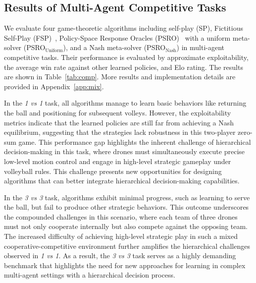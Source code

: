 \subsection{Results of Multi-Agent Competitive Tasks}
We evaluate four game-theoretic algorithms including self-play (SP), Fictitious Self-Play (FSP)~\cite{heinrich2015fictitious}, Policy-Space Response Oracles (PSRO)~\cite{lanctot2017unified} with a uniform meta-solver (PSRO$_\text{Uniform}$), and a Nash meta-solver (PSRO$_\text{Nash}$) in multi-agent competitive tasks. Their performance is evaluated by approximate exploitability, the average win rate against other learned policies, and Elo rating. 
The results are shown in Table~\ref{tab:comp}. 
More results and implementation details are provided in Appendix~\ref{app:mix}.

In the \textit{1 vs 1} task, all algorithms manage to learn basic behaviors like returning the ball and positioning for subsequent volleys. However, the exploitability metrics indicate that the learned policies are still far from achieving a Nash equilibrium, suggesting that the strategies lack robustness in this two-player zero-sum game. This performance gap highlights the inherent challenge of hierarchical decision-making in this task, where drones must simultaneously execute precise low-level motion control and engage in high-level strategic gameplay under volleyball rules. This challenge presents new opportunities for designing algorithms that can better integrate hierarchical decision-making capabilities.

In the \textit{3 vs 3} task, algorithms exhibit minimal progress, such as learning to serve the ball, but fail to produce other strategic behaviors.
This outcome underscores the compounded challenges in this scenario, where each team of three drones must not only cooperate internally but also compete against the opposing team. The increased difficulty of achieving high-level strategic play in such a mixed cooperative-competitive environment further amplifies the hierarchical challenges observed in \textit{1 vs 1}. As a result, the \textit{3 vs 3} task serves as a highly demanding benchmark that highlights the need for new approaches for learning in complex multi-agent settings with a hierarchical decision process.


